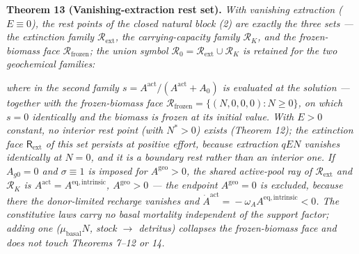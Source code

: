\documentclass[11pt]{article}
\begin{document}
\textbf{Theorem 13 (Vanishing-extraction rest set).} \emph{With vanishing extraction (\(E \equiv 0\)), the rest points of the closed natural block (2) are exactly the three sets --- the extinction family \(\mathcal{R}_{\mathrm{ext}}\), the carrying-capacity family \(\mathcal{R}_K\), and the frozen-biomass face \(\mathcal{R}_{\mathrm{frozen}}\); the union symbol \(\mathcal{R}_0 =\allowbreak{} \mathcal{R}_{\mathrm{ext}} \cup \mathcal{R}_K\) is retained for the two geochemical families:} 

\par\noindent{}\par

 \emph{where in the second family \(s =\allowbreak{} A^{\mathrm{act}}/(A^{\mathrm{act}} +\allowbreak{} A_0)\) is evaluated at the solution --- together with the frozen-biomass face \(\mathcal{R}_{\mathrm{frozen}} =\allowbreak{} \{(N,\allowbreak{} 0,\allowbreak{} 0,\allowbreak{} 0) : N \ge 0\}\), on which \(s = 0\) identically and the biomass is frozen at its initial value. With \(E>0\) constant, no interior rest point (with \(N^*>0\)) exists (Theorem 12); the extinction face \(\mathsf R_{\mathrm{ext}}\) of this set persists at positive effort, because extraction \(qEN\) vanishes identically at \(N=0\), and it is a boundary rest rather than an interior one. If \(A_{g0} = 0\) and \(\sigma \equiv 1\) is imposed for \(A^{\mathrm{geo}} > 0\), the shared active-pool ray of \(\mathcal{R}_{\mathrm{ext}}\) and \(\mathcal{R}_K\) is \(A^{\mathrm{act}} =\allowbreak{} A^{\mathrm{eq,\allowbreak{}intrinsic}}\), \(A^{\mathrm{geo}} > 0\) --- the endpoint \(A^{\mathrm{geo}} = 0\) is excluded, because there the donor-limited recharge vanishes and \(\dot A^{\mathrm{act}} =\allowbreak{} -\omega_A A^{\mathrm{eq,\allowbreak{}intrinsic}} < 0\). The constitutive laws carry no basal mortality independent of the support factor; adding one (\(\mu_{\mathrm{basal}} N\), stock \(\to\) detritus) collapses the frozen-biomass face and does not touch Theorems 7--12 or 14.}
\end{document}

